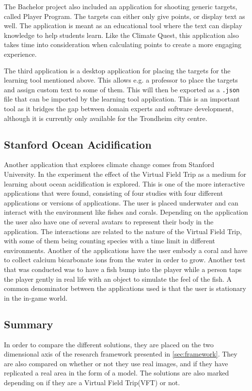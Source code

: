         The Bachelor project also included an application for shooting generic targets, called Player Program. The targets can either only give points, or display text as well. The application is meant as an educational tool where the text can display knowledge to help students learn. Like the Climate Quest, this application also takes time into consideration when calculating points to create a more engaging experience.
        
        The third application is a desktop application for placing the targets for the learning tool mentioned above. This allows e.g. a professor to place the targets and assign custom text to some of them. This will then be exported as a \texttt{.json} file that can be imported by the learning tool application. This is an important tool as it bridges the gap between domain experts and software development, although it is currently only available for the Trondheim city centre.
        
    \subsection{Stanford Ocean Acidification}
        Another application that explores climate change comes from Stanford University\cite{virtual_field_trips_learning}. In the experiment the effect of the Virtual Field Trip as a medium for learning about ocean acidification is explored. This is one of the more interactive applications that were found, consisting of four studies with four different applications or versions of applications. The user is placed underwater and can interact with the environment like fishes and corals. Depending on the application the user also have one of several avatars to represent their body in the application. The interactions are related to the nature of the Virtual Field Trip, with some of them being counting species with a time limit in different environments. Another of the applications have the user embody a coral and have to collect calcium bicarbonate ions from the water in order to grow. Another test that was conducted was to have a fish bump into the player while a person taps the player gently in real life with an object to simulate the feel of the fish. A common denominator between the applications used is that the user is stationary in the in-game world.
        
    \subsection{Summary}
        \label{sec:summary}
        In order to compare the different solutions, they are placed on the two dimensional axis of the research framework presented in \cref{sec:framework}. They are also compared on whether or not they use real images, and if they have replicated a real area in the form of a model. The solutions are also marked depending on if they are a Virtual Field Trip(VFT) or not.
    
